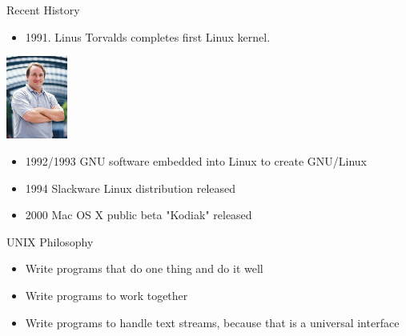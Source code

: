 \documentclass[xetex]{beamer}
\begin{document}
\begin{frame}[label={sec:org375f1ec}]{Recent History}
\begin{itemize}
\item 1991. Linus Torvalds completes first Linux kernel.
\end{itemize}
\begin{center}
\includegraphics[width=0.15\textwidth]{./figs/Linus_Torvalds.jpeg}
\end{center} 
\begin{itemize}
\item 1992/1993 GNU software embedded into Linux to create GNU/Linux
\item 1994 Slackware Linux distribution released
\item 2000 Mac OS X public beta "Kodiak" released
\end{itemize}
\end{frame}
\begin{frame}[label={sec:org4a70513}]{UNIX Philosophy}
\begin{itemize}
\item Write programs that do one thing and do it well
\item Write programs to work together
\item Write programs to handle text streams, because that is a universal interface
\end{itemize}
\end{frame}
\end{document}
